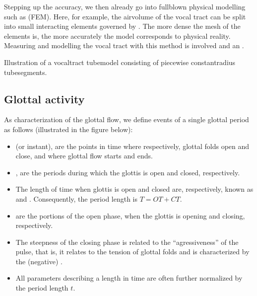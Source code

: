 \documentclass[letterpaper,10pt,english]{jupyterBook}
\begin{document}
\sphinxAtStartPar
Stepping up the accuracy, we then already go into full\sphinxhyphen{}blown physical
modelling such as  (FEM).
Here, for example, the air\sphinxhyphen{}volume of the vocal tract can be split into
small interacting elements governed by . The more dense
the mesh of the elements is, the more accurately the model corresponds
to physical reality. Measuring and modelling the vocal tract with this
method is involved and an .

\sphinxAtStartPar
{}

\sphinxAtStartPar
Illustration of a vocal\sphinxhyphen{}tract tube\sphinxhyphen{}model consisting of piece\sphinxhyphen{}wise
constant\sphinxhyphen{}radius tube\sphinxhyphen{}segments.


\subsection{Glottal activity}
\label{\detokenize{Introduction/Speech_production_and_acoustic_properties:glottal-activity}}
\sphinxAtStartPar
As characterization of the glottal flow, we define events of a single
glottal period as follows (illustrated in the figure below):
\begin{itemize}
\item {} 
\sphinxAtStartPar
{} (or instant), are the points in time
where respectively, glottal folds open and close, and where glottal
flow starts and ends.

\item {} 
\sphinxAtStartPar
{} , are the periods during which the glottis
is open and closed, respectively.

\item {} 
\sphinxAtStartPar
The length of time when glottis is open and closed are,
respectively,  known as  and .
Consequently, the period length is \(T=OT+CT\).

\item {} 
\sphinxAtStartPar
{} are the portions of the open phase,
when the glottis is opening and closing, respectively.

\item {} 
\sphinxAtStartPar
The steepness of the closing phase is related to the “agressiveness”
of the pulse, that is, it relates to the tension of glottal folds
and is characterized by the (negative) .

\item {} 
\sphinxAtStartPar
All parameters describing a length in time are often further
normalized by the period length \(t\).

\end{itemize}
\end{document}
